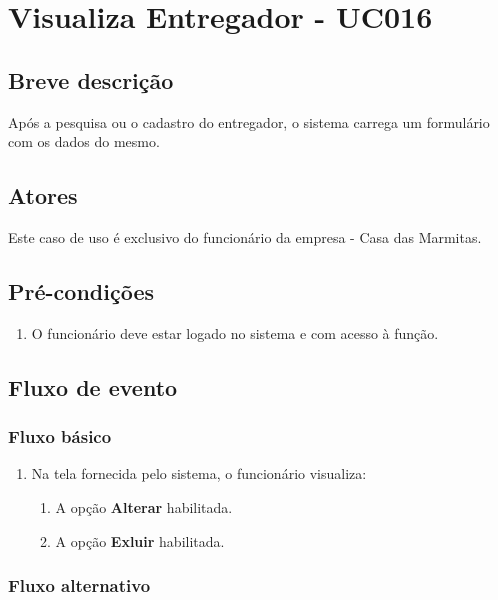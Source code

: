\chapter{Visualiza Entregador - UC016} \label{uc016}

\section{Breve descrição}

Após a pesquisa ou o cadastro do entregador, o sistema carrega um formulário com os dados do mesmo.

\section{Atores}

Este caso de uso é exclusivo do funcionário da empresa - Casa das Marmitas.

\section{Pré-condições}

\begin{enumerate}
	\item O funcionário deve estar logado no sistema e com acesso à função.
\end{enumerate}

\section{Fluxo de evento}

\subsection{Fluxo básico}

\begin{enumerate}
	\item Na tela fornecida pelo sistema, o funcionário visualiza:
	\begin{enumerate}
		\item A opção \textbf{Alterar} habilitada.
		\item A opção \textbf{Exluir} habilitada.
	\end{enumerate}		
\end{enumerate}

\subsection{Fluxo alternativo}

